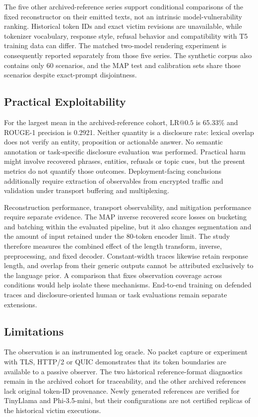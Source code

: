\documentclass[electronics,article,submit,pdftex,moreauthors]{Definitions/mdpi}
\begin{document}
The five other archived-reference series support conditional comparisons of the fixed reconstructor on their emitted texts, not an intrinsic model-vulnerability ranking. Historical token IDs and exact victim revisions are unavailable, while tokenizer vocabulary, response style, refusal behavior and compatibility with T5 training data can differ. The matched two-model rendering experiment is consequently reported separately from those five series. The synthetic corpus also contains only 60 scenarios, and the MAP test and calibration sets share those scenarios despite exact-prompt disjointness.

\subsection{Practical Exploitability}
For the largest mean in the archived-reference cohort, $\mathrm{LR}@0.5$ is 65.33\% and ROUGE-1 precision is 0.2921. Neither quantity is a disclosure rate: lexical overlap does not verify an entity, proposition or actionable answer. No semantic annotation or task-specific disclosure evaluation was performed. Practical harm might involve recovered phrases, entities, refusals or topic cues, but the present metrics do not quantify those outcomes. Deployment-facing conclusions additionally require extraction of observables from encrypted traffic and validation under transport buffering and multiplexing.

Reconstruction performance, transport observability, and mitigation performance require separate evidence. The MAP inverse recovered score losses on bucketing and batching within the evaluated pipeline, but it also changes segmentation and the amount of input retained under the 80-token encoder limit. The study therefore measures the combined effect of the length transform, inverse, preprocessing, and fixed decoder. Constant-width traces likewise retain response length, and overlap from their generic outputs cannot be attributed exclusively to the language prior. A comparison that fixes observation coverage across conditions would help isolate these mechanisms. End-to-end training on defended traces and disclosure-oriented human or task evaluations remain separate extensions.

\subsection{Limitations}
The observation is an instrumented log oracle. No packet capture or experiment with TLS, HTTP/2 or QUIC demonstrates that its token boundaries are available to a passive observer. The two historical reference-format diagnostics remain in the archived cohort for traceability, and the other archived references lack original token-ID provenance. Newly generated references are verified for TinyLlama and Phi-3.5-mini, but their configurations are not certified replicas of the historical victim executions.
\end{document}
